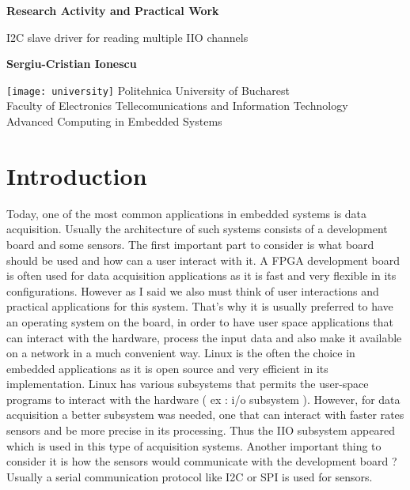 \documentclass[l2pt, letterpaper]{article}
\begin{document}
\begin{titlepage}
    \begin{center}
        \vspace*{1cm}
            
        \Huge
        \textbf{Research Activity and Practical Work}
            
        \vspace{0.5cm}
        \LARGE
        I2C slave driver for reading multiple IIO channels
            
        \vspace{1.5cm}
            
        \textbf{Sergiu-Cristian Ionescu}
            
          \vfill
            
       \vspace{0.8cm}
     
       \texttt{[image: university]}
        \Large
        Politehnica University of Bucharest\\
        Faculty of Electronics Tellecomunications and Information Technology\\
        Advanced Computing in Embedded Systems \\

            
    \end{center}
\end{titlepage}

\newpage

\section{Introduction}

Today, one of the most common applications in embedded systems is data acquisition. Usually the architecture of such systems consists of a development board and some sensors. The first important part to consider is what board should be used and how can a user interact with it. A FPGA development board is
often used for data acquisition applications as it is fast and very flexible in its
configurations. However as I said we also must think of user interactions and
practical applications for this system. That’s why it is usually preferred to have
an operating system on the board, in order to have user space applications that
can interact with the hardware, process the input data and also make it available
on a network in a much convenient way. Linux is the often the choice in
embedded applications as it is open source and very efficient in its
implementation. Linux has various subsystems that permits the user-space
programs to interact with the hardware ( ex : i/o subsystem ). However, for data
acquisition a better subsystem was needed, one that can interact with faster
rates sensors and be more precise in its processing. Thus the IIO subsystem
appeared which is used in this type of acquisition systems. Another important
thing to consider it is how the sensors would communicate with the development
board ? Usually a serial communication protocol like I2C or SPI is used for
sensors. \\
\end{document}
